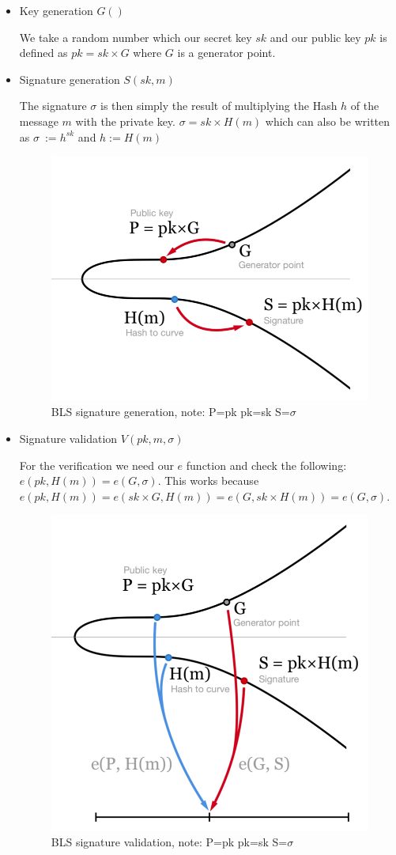 \documentclass[a4paper,12pt]{scrartcl}
\begin{document}
\begin{itemize}
	\item Key generation $G()$
	\begin{center}
		We take a random number which our secret key $sk$ and our public key $pk$ is defined as $pk = sk \times{G}$ where $G$ is a generator point.
	\end{center}
	\item Signature generation $S(sk, m) $
	\begin{center}
		The signature $\sigma$ is then simply the result of multiplying the Hash $h$ of the message $m$ with the private key. $\sigma = sk \times{H(m)}$ which can also be written as $ \sigma\ := h^{sk}$ and $h := H(m) $
	\end{center}
	\begin{figure}[hbt!]
		\centering
		\includegraphics[width=0.49\linewidth]{bls-sign}
		\caption{BLS signature generation, note: P=pk pk=sk S=$\sigma$}
	\end{figure}
	\item Signature validation $V(pk, m, \sigma)$
	\begin{center}
		For the verification we need our $e$ function and check the following:
		$e(pk,H(m)) = e(G,\sigma)$. This works because $e(pk,H(m)) = e(sk\times{G},H(m)) = e(G,sk\times{H(m)}) = e(G, \sigma)$.
	\end{center}
	\begin{figure}[hb!]
		\centering
		\includegraphics[width=0.49\linewidth]{bls-verify}
		\caption{BLS signature validation, note: P=pk pk=sk S=$\sigma$}
	\end{figure}
\end{itemize}
\end{document}
